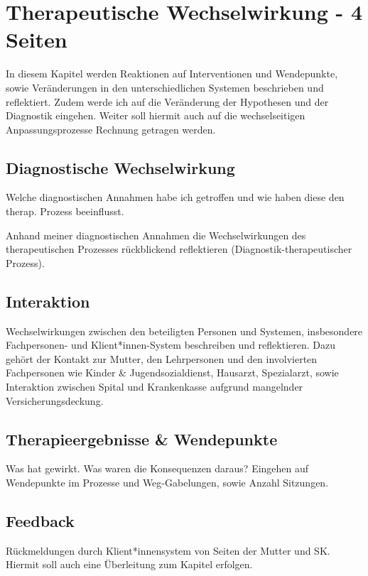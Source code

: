 \section{Therapeutische Wechselwirkung - 4 Seiten} \label{sec:TherapeutischeWechselwirkung}
In diesem Kapitel werden Reaktionen auf Interventionen und Wendepunkte, sowie Veränderungen in den unterschiedlichen Systemen beschrieben und reflektiert. Zudem werde ich auf die Veränderung der Hypothesen und der Diagnostik eingehen. Weiter soll hiermit auch auf die wechselseitigen Anpassungsprozesse Rechnung getragen werden. 

\subsection{Diagnostische Wechselwirkung} 
Welche diagnostischen Annahmen habe ich getroffen und wie haben diese den therap. Prozess beeinflusst.

Anhand meiner diagnostischen Annahmen die Wechselwirkungen des therapeutischen Prozesses rückblickend reflektieren (Diagnostik-therapeutischer Prozess). 



\subsection{Interaktion} Wechselwirkungen zwischen den beteiligten Personen und Systemen, insbesondere Fachpersonen- und Klient*innen-System beschreiben und reflektieren. Dazu gehört der Kontakt zur Mutter, den Lehrpersonen und den involvierten Fachpersonen wie Kinder \& Jugendsozialdienst, Hausarzt, Spezialarzt, sowie Interaktion zwischen Spital und Krankenkasse aufgrund mangelnder Versicherungsdeckung.



\subsection{Therapieergebnisse \& Wendepunkte} Was hat gewirkt. Was waren die Konsequenzen daraus? Eingehen auf Wendepunkte im Prozesse und Weg-Gabelungen, sowie Anzahl Sitzungen.




\subsection{Feedback} Rückmeldungen durch Klient*innensystem von Seiten der Mutter und SK. Hiermit soll auch eine Überleitung zum Kapitel  erfolgen.